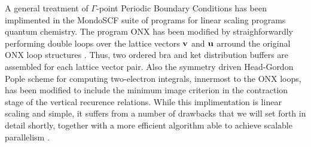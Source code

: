 \documentclass[prb,aps,nobibnotes,twocolumn,doublespace,twocolumngrid,superbib]{revtex4}
\begin{document}
A general treatment of $\Gamma$-point Periodic Boundary Conditions has been implimented in the MondoSCF
suite of programs for linear scaling programs quantum chemistry.  The program {\sc ONX} \cite{} has been 
modified by straighforwardly performing double loops over the lattice vectors $\bf v$ and $\bf u$
arround the original ONX loop structures \cite{}.  Thus, two ordered bra and ket distribution buffers are 
assembled for each lattice vector pair.   Also the symmetry driven Head-Gordon Pople scheme for 
computing two-electron integrals, innermost to the ONX loops, has been modified to include the 
minimum image criterion in the contraction stage of the vertical recurence relations.  While this 
implimentation is linear scaling and simple, it suffers from a number of drawbacks that we will set 
forth in detail shortly, together with a more efficient algorithm able to achieve scalable parallelism \cite{}.
\end{document}
